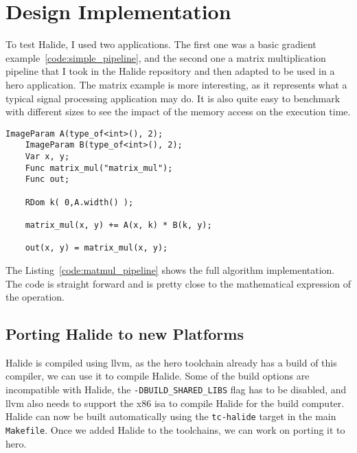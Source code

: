 


\chapter{Design Implementation}
    To test Halide, I used two applications. The first one was a basic gradient example~\ref{code:simple_pipeline}, and the second one a matrix multiplication pipeline that I took in the Halide repository and then adapted to be used in a hero application.
The matrix example is more interesting, as it represents what a typical signal processing application may do. It is also quite easy to benchmark with different sizes to see the impact of the memory access on the execution time.

\lstset{basicstyle=\ttfamily\footnotesize,breaklines=true,tabsize=2}
\begin{lstlisting}[caption={Matrix Multiplication Pipeline}, captionpos=b, label={code:matmul_pipeline}]
    ImageParam A(type_of<int>(), 2);
    ImageParam B(type_of<int>(), 2);
    Var x, y;
    Func matrix_mul("matrix_mul");
    Func out;

    RDom k( 0,A.width() );

    matrix_mul(x, y) += A(x, k) * B(k, y);

    out(x, y) = matrix_mul(x, y);

\end{lstlisting}
    The Listing~\ref{code:matmul_pipeline} shows the full algorithm implementation. The code is straight forward and is pretty close to the mathematical expression of the operation.


\section { Porting Halide to new Platforms}
    Halide is compiled using \gls{llvm}, as the \gls{hero} toolchain already has a build of this compiler, we can use it to compile Halide.
     Some of the build options are incompatible with Halide, the \texttt{-DBUILD\_SHARED\_LIBS} flag has to be disabled, and \gls{llvm} also needs to support the x86 \gls{isa} to compile Halide for the build computer.
    Halide can now be built automatically using the \texttt{tc-halide}  target in the main \texttt{Makefile}.
    Once we added Halide to the toolchains, we can work on porting it to \gls{hero}.


